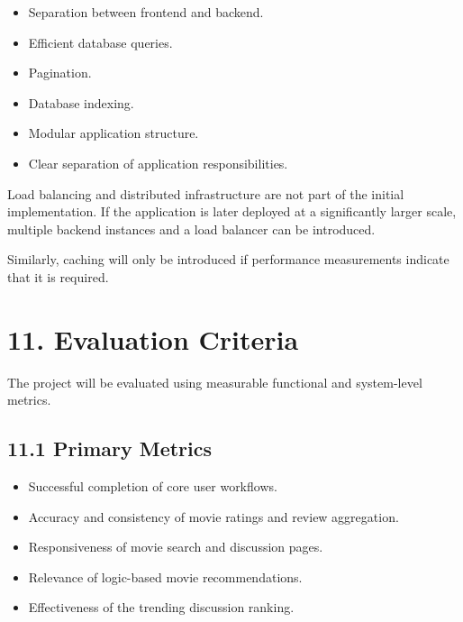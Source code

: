 \documentclass[11pt,a4paper]{article}
\begin{document}
\begin{itemize}

    \item Separation between frontend and backend.

    \item Efficient database queries.

    \item Pagination.

    \item Database indexing.

    \item Modular application structure.

    \item Clear separation of application responsibilities.

\end{itemize}

Load balancing and distributed infrastructure are not part of the initial implementation. If the application is later deployed at a significantly larger scale, multiple backend instances and a load balancer can be introduced.

Similarly, caching will only be introduced if performance measurements indicate that it is required.



\section{11. Evaluation Criteria}

The project will be evaluated using measurable functional and system-level metrics.

\subsection{11.1 Primary Metrics}

\begin{itemize}

    \item Successful completion of core user workflows.

    \item Accuracy and consistency of movie ratings and review aggregation.

    \item Responsiveness of movie search and discussion pages.

    \item Relevance of logic-based movie recommendations.

    \item Effectiveness of the trending discussion ranking.

\end{itemize}
\end{document}
